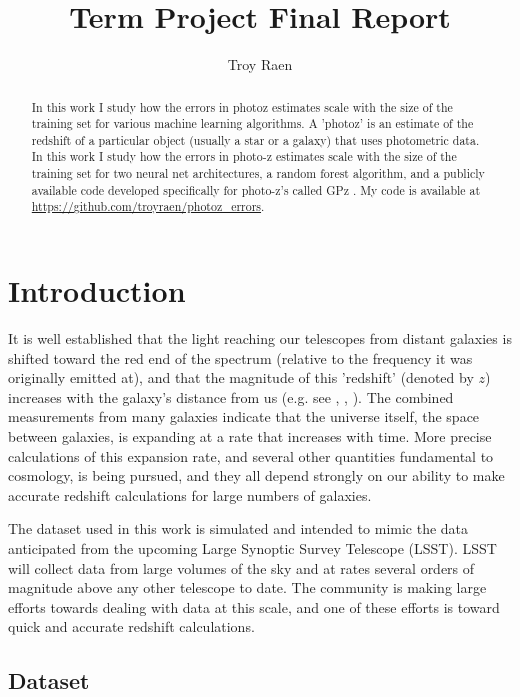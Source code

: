 \documentclass[13pt]{amsart}
\title{Term Project Final Report}
\author{Troy Raen}
\begin{document}


\begin{abstract}
  In this work I study how the errors in photoz estimates scale with the size of the training set for various machine learning algorithms. A 'photoz' is an estimate of the redshift of a particular object (usually a star or a galaxy) that uses photometric data. In this work I study how the errors in photo-z estimates scale with the size of the training set for two neural net architectures, a random forest algorithm, and a publicly available code developed specifically for photo-z's called GPz \cite{gpz}. My code is available at \url{https://github.com/troyraen/photoz_errors}.
\end{abstract}


\maketitle



\section{Introduction}

  It is well established that the light reaching our telescopes from distant galaxies is shifted toward the red end of the spectrum (relative to the frequency it was originally emitted at), and that the magnitude of this 'redshift' (denoted by $z$) increases with the galaxy's distance from us (e.g. see \cite{newman}, \cite{graham}, \cite{pzreview}). The combined measurements from many galaxies indicate that the universe itself, the space between galaxies, is expanding at a rate that increases with time. More precise calculations of this expansion rate, and several other quantities fundamental to cosmology, is being pursued, and they all depend strongly on our ability to make accurate redshift calculations for large numbers of galaxies.

  The dataset used in this work is simulated and intended to mimic the data anticipated from the upcoming Large Synoptic Survey Telescope (LSST). LSST will collect data from large volumes of the sky and at rates several orders of magnitude above any other telescope to date. The community is making large efforts towards dealing with data at this scale, and one of these efforts is toward quick and accurate redshift calculations.

  \subsection{Dataset}
\end{document}
